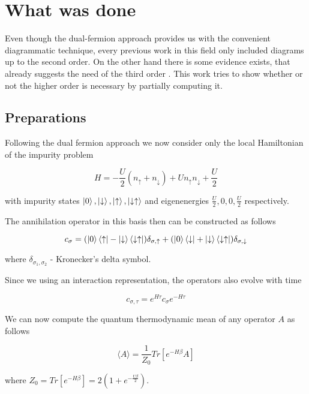 \section{What was done}
Even though the dual-fermion approach provides us with the convenient diagrammatic technique, every previous work in this field only included
 diagrams up to the second order. On the other hand there is some evidence exists, that already suggests the need of the third order \cite{}.
This work tries to show whether or not the higher order is necessary by partially computing it.
\subsection{Preparations}
Following the dual fermion approach we now consider only the local Hamiltonian of the impurity problem

\begin{equation} H = -\frac{U}{2} \left(n_{\uparrow}+n_{\downarrow}\right) + U n_{\uparrow} n_{\downarrow} + \frac{U}{2} \end{equation}

with impurity states $\ket{0},\ket{\downarrow},\ket{\uparrow},\ket{\downarrow\uparrow}$ and eigenenergies $\frac{U}{2},0,0,\frac{U}{2}$ respectively.

The annihilation operator in this basis then can be constructed as follows

\begin{equation} c_\sigma =  	(\ket{0}\bra{\uparrow}-\ket{\downarrow}\bra{\downarrow\uparrow})\delta_{\sigma,\uparrow}
	+	(\ket{0}\bra{\downarrow}+\ket{\downarrow}\bra{\downarrow\uparrow})\delta_{\sigma,\downarrow} \end{equation}

where $\delta_{\sigma_1,\sigma_2}$ - Kronecker's delta symbol.

Since we using an interaction representation, the operators also evolve with time

\begin{equation} c_{\sigma,\tau} = e^{H\tau}c_\sigma e^{-H\tau} \end{equation}

We can now compute the quantum thermodynamic mean of any operator $A$ as follows

\begin{equation} \langle A\rangle = \frac{1}{Z_0}Tr[e^{-H\beta}A] \end{equation}

where $Z_0 = Tr[e^{-H\beta}] = 2(1+e^{-\frac{U\beta}{2}})$.

